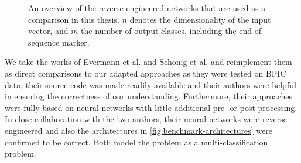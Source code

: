 \begin{figure}
\centering
{}
\qquad
{}
\caption[Overview of the reverse-engineered networks]{An overview of the reverse-engineered networks that are used as a comparison in this thesis. $n$ denotes the dimensionality of the input vector, and $m$ the number of output classes, including the end-of-sequence marker.}
\label{fig:benchmark-architectures}
\end{figure}

We take the works of Evermann et al. and Schönig et al. and reimplement them as direct comparisons to our adapted approaches as they were tested on BPIC data, their source code was made readily available and their authors were helpful in ensuring the correctness of our understanding. Furthermore, their approaches were fully based on neural-networks with little additional pre- or post-processing. In close collaboration with the two authors, their neural networks were reverse-engineered and also the architectures in \autoref{fig:benchmark-architectures} were confirmed to be correct. Both model the problem as a multi-classification problem.

